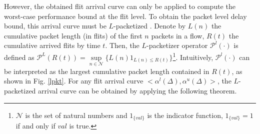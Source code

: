 \documentclass[preprint]{elsarticle}
\begin{document}
However, the obtained flit arrival curve can only be applied to compute the worst-case performance bound at the flit level. To obtain the packet level delay bound, this arrival curve must be $L$-packetized \cite{Boudec2001Network}. Denote by $L(n)$ the cumulative packet length (in flits) of the first $n$ packets in a flow, $R(t)$ the cumulative arrived flits by time $t$. Then, the $L$-packetizer operator $\mathcal{P}^l(\cdot)$ is defined as $\mathcal{P}^L(R(t))=\underset{n\in\mathcal{N}}{\sup}\{L(n)1_{L(n)\leq R(t)}\}$\footnote{$\mathcal{N}$ is the set of natural numbers and $1_{\{val\}}$ is the indicator function, $1_{\{val\}}=1$ if and only if $val$ is true.}. Intuitively, $\mathcal{P}^l(\cdot)$ can be interpreted as the largest cumulative packet length contained in $R(t)$, as shown in Fig. \ref{lpkt}. For any flit arrival curve $<\alpha^l(\Delta),\alpha^u(\Delta)>$, the $L$-packetized arrival curve can be obtained by applying the following theorem.
\end{document}
